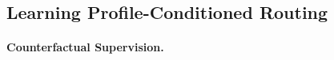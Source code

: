 \documentclass[letterpaper]{article} %
\begin{document}


\subsection{Learning Profile-Conditioned Routing}

\paragraph{Counterfactual Supervision.}
\end{document}

